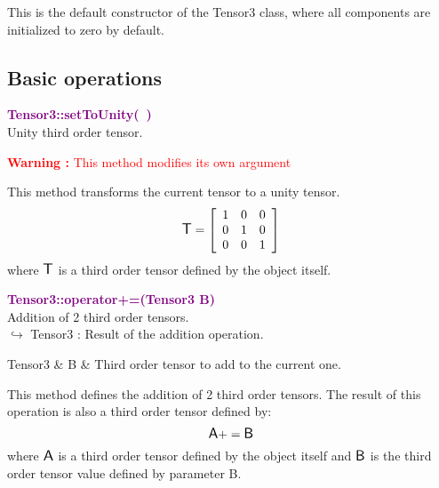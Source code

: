 This is the default constructor of the Tensor3 class, where all components are initialized to zero by default.

\subsection{Basic operations}

\textcolor{purple}{\textbf{Tensor3::setToUnity(~)}}\label{Tensor3::setToUnity()}\\
Unity third order tensor.

\hspace*{10mm}\textcolor{red}{\textbf{Warning :} This method modifies its own argument}

This method transforms the current tensor to a unity tensor.
\begin{equation*}
\mbox{\large\ensuremath{\mathsf{T}}}=\left[\begin{array}{ccc}
1&0&0\\
0&1&0\\
0&0&1
\end{array}\right]
\end{equation*}
where $\mbox{\large\ensuremath{\mathsf{T}}}$ is a third order tensor defined by the object itself.

\textcolor{purple}{\textbf{Tensor3::operator+=(Tensor3 B)}}\label{Tensor3::operator+=(Tensor3 B)}\\
Addition of 2 third order tensors.\\ \hspace*{10mm}$\hookrightarrow$ Tensor3 : Result of the addition operation.

\begin{tcolorbox}[width=\textwidth,myArgs,tabularx={ll|R}]
Tensor3 & B & Third order tensor to add to the current one.
\end{tcolorbox}

This method defines the addition of 2 third order tensors.
The result of this operation is also a third order tensor defined by:
\begin{equation*}
\mbox{\large\ensuremath{\mathsf{A}}} += \mbox{\large\ensuremath{\mathsf{B}}}
\end{equation*}
where $\mbox{\large\ensuremath{\mathsf{A}}}$ is a third order tensor defined by the object itself and $\mbox{\large\ensuremath{\mathsf{B}}}$ is the third order tensor value defined by parameter B.

